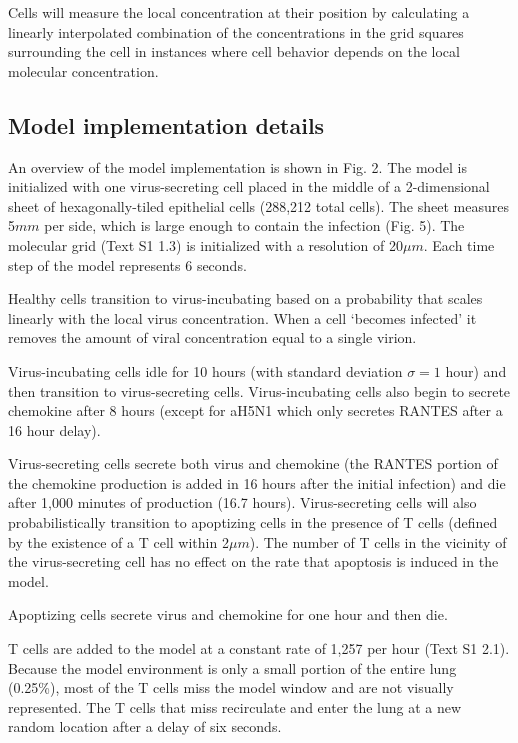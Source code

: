 \documentclass[preprint,10pt,authoryear]{elsarticle}
\begin{document}
Cells will measure the local concentration at their position by calculating a linearly interpolated combination of the concentrations in the grid squares surrounding the cell in instances where cell behavior depends on the local molecular concentration.


\subsection{Model implementation details}

An overview of the model implementation is shown in Fig. 2.  The model is initialized with one virus-secreting cell placed in the middle of a 2-dimensional sheet of hexagonally-tiled epithelial cells (288,212 total cells).  The sheet measures 5$mm$ per side, which is large enough to contain the infection (Fig. 5).  The molecular grid (Text S1 1.3) is initialized with a resolution of 20$\mu m$.  Each time step of the model represents 6 seconds.

Healthy cells transition to virus-incubating based on a probability that scales linearly with the local virus concentration.   When a cell `becomes infected' it removes the amount of viral concentration equal to a single virion. 

Virus-incubating cells idle for 10 hours (with standard deviation $\sigma=1$ hour) and then transition to virus-secreting cells.  Virus-incubating cells also begin to secrete chemokine after 8 hours (except for aH5N1 which only secretes RANTES after a 16 hour delay).  

Virus-secreting cells secrete both virus and chemokine (the RANTES portion of the chemokine production is added in 16 hours after the initial infection) and die after 1,000 minutes of production (16.7 hours).  Virus-secreting cells will also probabilistically transition to apoptizing cells in the presence of T cells (defined by the existence of a T cell within 2$\mu m$).  The number of T cells in the vicinity of the virus-secreting cell has no effect on the rate that apoptosis is induced in the model.

Apoptizing cells secrete virus and chemokine for one hour and then die.

T cells are added to the model at a constant rate of 1,257 per hour (Text S1 2.1).  Because the model environment is only a small portion of the entire lung (0.25\%), most of the T cells miss the model window and are not visually represented.  The T cells that miss recirculate and enter the lung at a new random location after a delay of six seconds.
\end{document}

